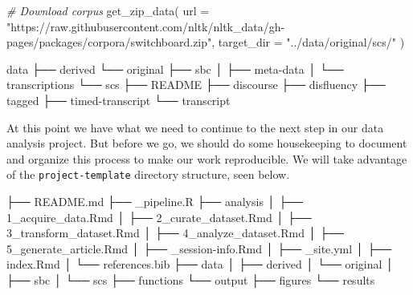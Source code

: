\documentclass[
  letterpaper,
]{latex/krantz}
\newenvironment{Shaded}{\begin{snugshade}}{\end{snugshade}}
\newcommand{\AttributeTok}[1]{\textcolor[rgb]{0.00,0.00,0.00}{#1}}
\newcommand{\CommentTok}[1]{\textcolor[rgb]{0.00,0.00,0.00}{\textit{#1}}}
\newcommand{\ExtensionTok}[1]{\textcolor[rgb]{0.00,0.00,0.00}{#1}}
\newcommand{\FunctionTok}[1]{\textcolor[rgb]{0.00,0.00,0.00}{#1}}
\newcommand{\NormalTok}[1]{\textcolor[rgb]{0.00,0.00,0.00}{#1}}
\newcommand{\StringTok}[1]{\textcolor[rgb]{0.00,0.00,0.00}{#1}}
\begin{document}
\begin{Shaded}
\begin{Highlighting}[]
\CommentTok{\# Download corpus}
\FunctionTok{get\_zip\_data}\NormalTok{(}
  \AttributeTok{url =} \StringTok{"https://raw.githubusercontent.com/nltk/nltk\_data/gh{-}pages/packages/corpora/switchboard.zip"}\NormalTok{, }
  \AttributeTok{target\_dir =} \StringTok{"../data/original/scs/"}
\NormalTok{)}
\end{Highlighting}
\end{Shaded}

\begin{Shaded}
\begin{Highlighting}[]
\ExtensionTok{data}
\ExtensionTok{├──}\NormalTok{ derived}
\ExtensionTok{└──}\NormalTok{ original}
    \ExtensionTok{├──}\NormalTok{ sbc}
    \ExtensionTok{│}\NormalTok{   ├── meta{-}data}
    \ExtensionTok{│}\NormalTok{   └── transcriptions}
    \ExtensionTok{└──}\NormalTok{ scs}
        \ExtensionTok{├──}\NormalTok{ README}
        \ExtensionTok{├──}\NormalTok{ discourse}
        \ExtensionTok{├──}\NormalTok{ disfluency}
        \ExtensionTok{├──}\NormalTok{ tagged}
        \ExtensionTok{├──}\NormalTok{ timed{-}transcript}
        \ExtensionTok{└──}\NormalTok{ transcript}
\end{Highlighting}
\end{Shaded}

At this point we have what we need to continue to the next step in our
data analysis project. But before we go, we should do some housekeeping
to document and organize this process to make our work reproducible. We
will take advantage of the \texttt{project-template} directory
structure, seen below.

\begin{Shaded}
\begin{Highlighting}[]
\ExtensionTok{├──}\NormalTok{ README.md}
\ExtensionTok{├──}\NormalTok{ \_pipeline.R}
\ExtensionTok{├──}\NormalTok{ analysis}
\ExtensionTok{│}\NormalTok{   ├── 1\_acquire\_data.Rmd}
\ExtensionTok{│}\NormalTok{   ├── 2\_curate\_dataset.Rmd}
\ExtensionTok{│}\NormalTok{   ├── 3\_transform\_dataset.Rmd}
\ExtensionTok{│}\NormalTok{   ├── 4\_analyze\_dataset.Rmd}
\ExtensionTok{│}\NormalTok{   ├── 5\_generate\_article.Rmd}
\ExtensionTok{│}\NormalTok{   ├── \_session{-}info.Rmd}
\ExtensionTok{│}\NormalTok{   ├── \_site.yml}
\ExtensionTok{│}\NormalTok{   ├── index.Rmd}
\ExtensionTok{│}\NormalTok{   └── references.bib}
\ExtensionTok{├──}\NormalTok{ data}
\ExtensionTok{│}\NormalTok{   ├── derived}
\ExtensionTok{│}\NormalTok{   └── original}
\ExtensionTok{│}\NormalTok{       ├── sbc}
\ExtensionTok{│}\NormalTok{       └── scs}
\ExtensionTok{├──}\NormalTok{ functions}
\ExtensionTok{└──}\NormalTok{ output}
    \ExtensionTok{├──}\NormalTok{ figures}
    \ExtensionTok{└──}\NormalTok{ results}
\end{Highlighting}
\end{Shaded}
\end{document}
